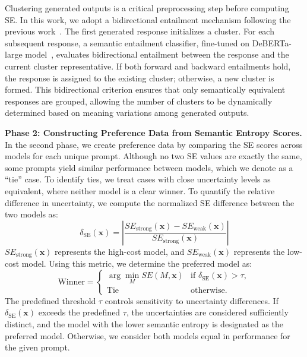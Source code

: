 Clustering generated outputs is a critical preprocessing step before computing SE. In this work, we adopt a bidirectional entailment mechanism following the previous work~\cite{kuhn2023semantic}. The first generated response initializes a cluster. For each subsequent response, a semantic entailment classifier, fine-tuned on DeBERTa-large model~\cite{He2020DeBERTaDB}, evaluates bidirectional entailment between the response and the current cluster representative. If both forward and backward entailments hold, the response is assigned to the existing cluster; otherwise, a new cluster is formed. This bidirectional criterion ensures that only semantically equivalent responses are grouped, allowing the number of clusters to be dynamically determined based on meaning variations among generated outputs.


\noindent \textbf{Phase 2: Constructing Preference Data from Semantic Entropy Scores.}
In the second phase, we create preference data by comparing the SE scores across models for each unique prompt. Although no two SE values are exactly the same, some prompts yield similar performance between models, which we denote as a “tie” case. To identify ties, we treat cases with close uncertainty levels as equivalent, where neither model is a clear winner.
To quantify the relative difference in uncertainty, we compute the normalized SE difference between the two models as:
\vspace{-1mm}
\begin{equation}
\delta_{\text{SE}}(\mathbf{x}) = \left| \frac{SE_{\text{strong}}(\mathbf{x}) - SE_{\text{weak}}(\mathbf{x})}{SE_{\text{strong}}(\mathbf{x})} \right|
\label{equation:normalized_se}
\end{equation}
$SE_{\text{strong}}(\mathbf{x})$ represents the high-cost model, and $SE_{\text{weak}}(\mathbf{x})$ represents the low-cost model. Using this metric, we determine the preferred model as:
\begin{equation} 
\text{Winner} = 
\begin{cases} 
\arg\min\limits_{M} SE(M, \mathbf{x}) & \text{if } \delta_{\text{SE}}(\mathbf{x}) > \tau, \\
\text{Tie} & \text{otherwise}.
\end{cases} 
\label{equation:threshold} 
\end{equation}
The predefined threshold $\tau$ controls sensitivity to uncertainty differences. If $\delta_{\text{SE}}(\mathbf{x})$ exceeds the predefined $\tau$, the uncertainties are considered sufficiently distinct, and the model with the lower semantic entropy is designated as the preferred model. Otherwise, we consider both models equal in performance for the given prompt.

